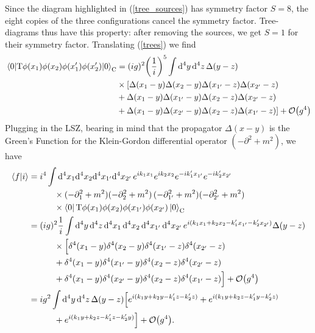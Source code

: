 Since the diagram highlighted in (\ref{tree_sources}) has symmetry factor $S=8$, the eight copies of the three configurations cancel the symmetry factor. Tree-diagrams thus have this property: after removing the sources, we get $S=1$ for their symmetry factor. Translating (\ref{trees}) we find
\begin{equation}
\begin{aligned}
  \vev{\text{T}\phi(x_1)\phi(x_2)\phi(x_1^\prime)\phi(x_2^\prime)}_{\text{C}}&=(ig)^2\qty(\frac{1}{i})^5\int\dd^4 y\,\dd^4 z\, \Delta(y-z)\\
  &\times[\Delta(x_1-y)\Delta(x_2-y)\Delta(x_{1^\prime}-z)\Delta(x_{2^\prime}-z)\\
  &+\Delta(x_1-y)\Delta(x_{1^\prime}-y)\Delta(x_2-z)\Delta(x_{2^\prime}-z)\\
  &+\Delta(x_1-y)\Delta(x_{2^\prime}-y)\Delta(x_2-z)\Delta(x_{1^\prime}-z)]+\order{g^4}
\end{aligned}
\end{equation}
Plugging in the LSZ, bearing in mind that the propagator $\Delta(x-y)$ is the Green's Function for the Klein-Gordon differential operator $(-\partial^2+m^2)$, we have
\begin{equation}
\begin{aligned}
   \braket{f}{i}&=i^4\int\dd^4x_1\dd^4x_2\dd^4x_{1^\prime}\dd^4x_{2^\prime}\,e^{ik_1x_1}e^{ik_2x_2}e^{-ik_{1}^\prime x_{1^\prime}}e^{-ik_{2}^\prime x_{2^\prime}}\\&\qquad\quad\times(-\partial_1^2+m^2)(-\partial_2^2+m^2)
    \,(-\partial_{1^\prime}^2+m^2)(-\partial_{2^\prime}^2+m^2)\\&\qquad\quad\times\bra{0}\text{T}\phi(x_1)\phi(x_2)\phi(x_{1^\prime})\phi(x_{2^\prime})\ket{0}_{\text{C}}\\
    &=(ig)^2\frac{1}{i}\int\dd^4y\,\dd^4z\,\dd^4x_1\,\dd^4x_2\,\dd^4x_{1^\prime}\,\dd^4x_{2^\prime}\, e^{i(k_1x_1+k_2x_2-k_1^\prime x_{1^\prime} - k_2^\prime x_{2^\prime})}\Delta(y-z)\\
    &\qquad\quad\times\Big{[}\delta^4(x_1-y)\delta^4(x_2-y)\delta^4(x_{1^\prime}-z)\delta^4(x_{2^\prime}-z)\\
  &\qquad\quad+\delta^4(x_1-y)\delta^4(x_{1^\prime}-y)\delta^4(x_2-z)\delta^4(x_{2^\prime}-z)\\
  &\qquad\quad+\delta^4(x_1-y)\delta^4(x_{2^\prime}-y)\delta^4(x_2-z)\delta^4(x_{1^\prime}-z)\Big{]}+\order{g^4}\\
  &=ig^2\int\dd^4y\,\dd^4z\,\Delta(y-z)\Big{[}e^{i(k_1y+k_2y-k_1^\prime z -k_2^\prime z)}+e^{i(k_1y+k_2z-k_1^\prime y -k_2^\prime z)}  \\&\qquad\quad + e^{i(k_1y+k_2z-k_1^\prime z - k_2^\prime y)}\Big{]}+\order{g^4}.
\end{aligned}
\end{equation}
